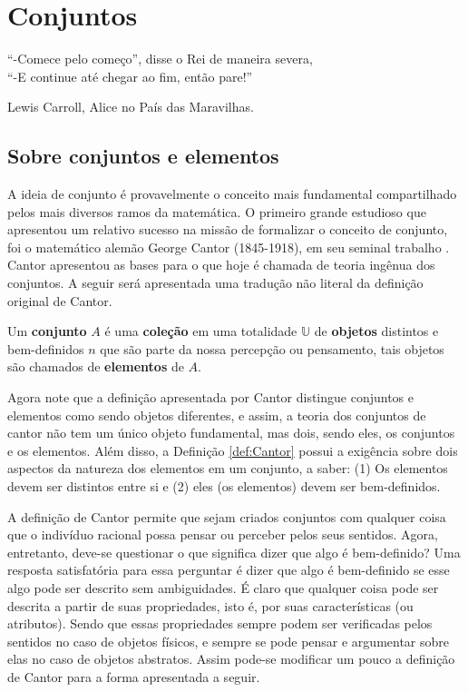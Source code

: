 \chapter{Conjuntos}\label{cap:Sets}

\epigraph{``-Comece pelo começo'', disse o Rei de maneira severa,\\ ``-E continue até chegar ao fim, então pare!''}{Lewis Carroll, Alice no País das Maravilhas.}

\section{Sobre conjuntos e elementos}\label{sec:ConjuntoElemento}

A ideia de conjunto é provavelmente o conceito mais fundamental compartilhado pelos mais diversos ramos da matemática. O primeiro grande estudioso que apresentou um relativo sucesso na missão de formalizar o conceito de conjunto, foi o matemático alemão George Cantor (1845-1918), em seu seminal trabalho \cite{cantor1895}. Cantor apresentou as bases para o que hoje é chamada de teoria ingênua dos conjuntos. A seguir será apresentada uma tradução não literal da definição original de Cantor.

\begin{definicao}\label{def:Cantor}
  Um \textbf{conjunto} $A$ é uma \textbf{coleção} em uma totalidade $\mathbb{U}$ de \textbf{objetos} distintos e bem-definidos $n$ que são parte da nossa percepção ou pensamento, tais objetos são chamados de \textbf{elementos} de $A$.
\end{definicao}

Agora note que a definição apresentada por Cantor distingue conjuntos e elementos como sendo objetos diferentes, e assim, a teoria dos conjuntos de cantor não tem um único objeto fundamental, mas dois, sendo eles, os conjuntos e os elementos. Além disso, a Definição \ref{def:Cantor} possui a exigência sobre dois aspectos da natureza dos elementos em um conjunto, a saber:  (1) Os elementos devem ser distintos entre si e (2) eles (os elementos) devem ser bem-definidos.

A definição de Cantor permite que sejam criados conjuntos com qualquer coisa que o indivíduo racional possa pensar ou perceber pelos seus sentidos. Agora, entretanto, deve-se questionar o que significa dizer que algo é bem-definido? Uma resposta satisfatória para essa perguntar é dizer que algo é bem-definido se esse algo pode ser descrito sem ambiguidades. É claro que qualquer coisa pode ser descrita a partir de suas propriedades, isto é, por suas características (ou atributos). Sendo que essas propriedades sempre podem ser verificadas pelos sentidos no caso de objetos físicos, e sempre se pode pensar e argumentar sobre elas no caso de objetos abstratos. Assim pode-se modificar um pouco a definição de Cantor para a forma apresentada a seguir.

